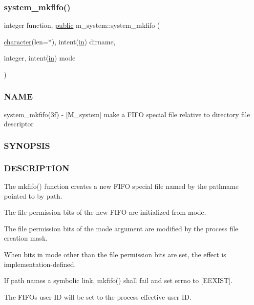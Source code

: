 \subsubsection{\texorpdfstring{system\+\_\+mkfifo()}{system\_mkfifo()}}
{\footnotesize\ttfamily integer function, \hyperlink{M__stopwatch_83_8txt_a2f74811300c361e53b430611a7d1769f}{public} m\+\_\+system\+::system\+\_\+mkfifo (\begin{DoxyParamCaption}\item[{\hyperlink{option__stopwatch_83_8txt_abd4b21fbbd175834027b5224bfe97e66}{character}(len=$\ast$), intent(\hyperlink{M__journal_83_8txt_afce72651d1eed785a2132bee863b2f38}{in})}]{dirname,  }\item[{integer, intent(\hyperlink{M__journal_83_8txt_afce72651d1eed785a2132bee863b2f38}{in})}]{mode }\end{DoxyParamCaption})}



\subsubsection*{N\+A\+ME}

system\+\_\+mkfifo(3f) -\/ \mbox{[}M\+\_\+system\mbox{]} make a F\+I\+FO special file relative to directory file descriptor \subsubsection*{S\+Y\+N\+O\+P\+S\+IS}

\subsubsection*{D\+E\+S\+C\+R\+I\+P\+T\+I\+ON}

The mkfifo() function creates a new F\+I\+FO special file named by the pathname pointed to by path.

The file permission bits of the new F\+I\+FO are initialized from mode.

The file permission bits of the mode argument are modified by the process\textquotesingle{} file creation mask.

When bits in mode other than the file permission bits are set, the effect is implementation-\/defined.

If path names a symbolic link, mkfifo() shall fail and set errno to \mbox{[}E\+E\+X\+I\+ST\mbox{]}.

The F\+I\+FO\textquotesingle{}s user ID will be set to the process\textquotesingle{} effective user ID.

